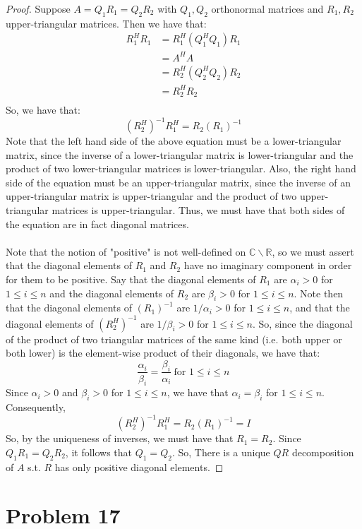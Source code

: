 \documentclass{article}
\begin{document}
\begin{proof}
Suppose $A = Q_{1}R_{1} = Q_{2}R_{2}$ with $Q_1, Q_2$ orthonormal matrices and $R_1, R_2$ upper-triangular matrices. Then we have that:
\begin{align*}
R_1^{H}R_1 &= R_1^{H}(Q_1^{H}Q_1)R_1 \\
&= A^{H}A \\
&= R_2^{H}(Q_2^{H}Q_2)R_2 \\
&= R_2^{H}R_2 \\
\end{align*}
So, we have that:
$$(R_2^{H})^{-1}R_1^{H} = R_{2}(R_1)^{-1}$$
Note that the left hand side of the above equation must be a lower-triangular matrix, since the inverse of a lower-triangular matrix is lower-triangular and the product of two lower-triangular matrices is lower-triangular. Also, the right hand side of the equation must be an upper-triangular matrix, since the inverse of an upper-triangular matrix is upper-triangular and the product of two upper-triangular matrices is upper-triangular. Thus, we must have that both sides of the equation are in fact diagonal matrices. \\
\\
Note that the notion of "positive" is not well-defined on $\mathbb{C} \backslash \mathbb{R}$, so we must assert that the diagonal elements of $R_1$ and $R_2$ have no imaginary component in order for them to be positive. Say that the diagonal elements of $R_1$ are $\alpha_i > 0$ for $1 \leq i \leq n$ and the diagonal elements of $R_2$ are $\beta_i > 0$ for $1 \leq i \leq n$. Note then that the diagonal elements of $(R_1)^{-1}$ are $1 / \alpha_i > 0$ for $1 \leq i \leq n$, and that the diagonal elements of $(R_2^{H})^{-1}$ are $1 / \beta_i > 0$ for $1 \leq i \leq n$. So, since the diagonal of the product of two triangular matrices of the same kind (i.e. both upper or both lower) is the element-wise product of their diagonals, we have that:
$$\frac{\alpha_i}{\beta_i} = \frac{\beta_i}{\alpha_i} \ \text{for $1 \leq i \leq n$}$$
Since $\alpha_i > 0$ and $\beta_i > 0$ for $1 \leq i \leq n$, we have that $\alpha_i = \beta_i$ for $1 \leq i \leq n$. Consequently,
$$(R_2^{H})^{-1}R_1^{H} = R_{2}(R_1)^{-1} = I$$
So, by the uniqueness of inverses, we must have that $R_1 = R_2$. Since $Q_{1}R_{1} = Q_{2}R_{2}$, it follows that $Q_{1} = Q_{2}$. So, There is a unique $QR$ decomposition of $A$ s.t. $R$ has only positive diagonal elements.
\end{proof}


\section*{Problem 17}
\end{document}
